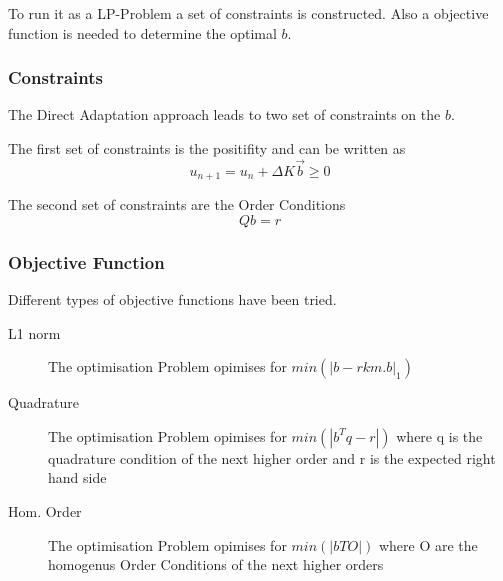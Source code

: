 \documentclass{article}
\begin{document}
To run it as a LP-Problem a set of constraints is constructed.  
Also a objective function is needed to determine the optimal $b$.

\subsubsection{Constraints}
The Direct Adaptation approach leads to two set of constraints on the $b$.

The first set of constraints is the positifity and can be written as 
$$u_{n+1}=u_n+\Delta K \vec{b} \geq 0$$

The second set of constraints are the Order Conditions
$$Qb=r$$



\subsubsection{Objective Function}
Different types of objective functions have been tried. 

\begin{description}

\item[L1 norm] The optimisation Problem opimises for $min(|b-rkm.b|_1)$
            
\item[Quadrature]   The optimisation Problem opimises for $min(|b^Tq-r|)$
                            where q is the quadrature condition of the next higher order 
                            and r is the expected right hand side
            
\item[Hom. Order]    The optimisation Problem opimises for $min(|bTO|)$ where O are the homogenus Order Conditions of the next higher orders
                            
 
\end{description}
\end{document}
